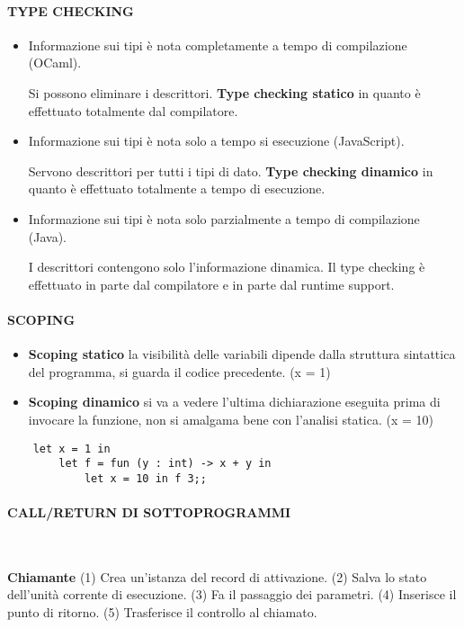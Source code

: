 \documentclass[a4paper, 12pt]{article}
\begin{document}
\paragraph{TYPE CHECKING}
\begin{itemize}
    \item Informazione sui tipi è nota completamente a tempo di compilazione (OCaml).
    
    Si possono eliminare i descrittori. \textbf{Type checking statico} in quanto è
    effettuato totalmente dal compilatore.
    
    \item Informazione sui tipi è nota solo a tempo si esecuzione (JavaScript).
    
    Servono descrittori per tutti i tipi di dato. \textbf{Type checking dinamico} in quanto
    è effettuato totalmente a tempo di esecuzione.
    
    \item Informazione sui tipi è nota solo parzialmente a tempo di compilazione (Java).
    
    I descrittori contengono solo l'informazione dinamica. Il type checking è effettuato
    in parte dal compilatore e in parte dal runtime support.
\end{itemize}

\paragraph{SCOPING}
\begin{itemize}
    \item \textbf{Scoping statico} la visibilità delle variabili dipende dalla struttura
    sintattica del programma, si guarda il codice precedente. (x = 1)
    \item \textbf{Scoping dinamico} si va a vedere l'ultima dichiarazione eseguita prima
    di invocare la funzione, non si amalgama bene con l'analisi statica. (x = 10)
\end{itemize}
\begin{lstlisting}
    let x = 1 in                    
        let f = fun (y : int) -> x + y in
            let x = 10 in f 3;;
\end{lstlisting}

\paragraph{CALL/RETURN DI SOTTOPROGRAMMI} \ 

\textbf{Chiamante} (1) Crea un'istanza del record di attivazione. (2) Salva lo stato
dell'unità corrente di esecuzione. (3) Fa il passaggio dei parametri. (4) Inserisce il
punto di ritorno. (5) Trasferisce il controllo al chiamato.
\end{document}
